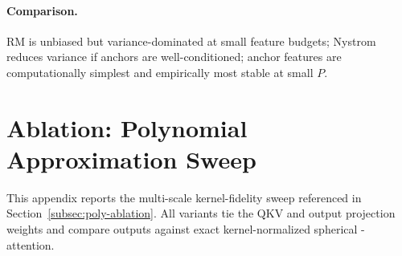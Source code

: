\documentclass{article}
\DeclareRobustCommand{\E}{\text{\normalfont\tifinaghfont ⵟ}}
\begin{document}
\paragraph{Comparison.}
RM is unbiased but variance-dominated at small feature budgets;
Nystrom reduces variance if anchors are well-conditioned;
anchor features are computationally simplest and empirically most stable
at small $P$.

\section{Ablation: Polynomial Approximation Sweep}
\label{app:poly-ablation}

This appendix reports the multi-scale kernel-fidelity sweep referenced in Section~\ref{subsec:poly-ablation}. All variants tie the $\mathrm{QKV}$ and output projection weights and compare outputs against exact kernel-normalized spherical \E-attention.
\end{document}
